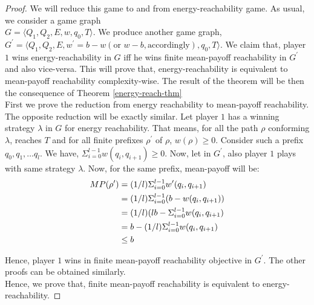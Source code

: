 \begin{proof}
We will reduce this game to and from energy-reachability game. As usual, we consider a game graph\\ $G=\langle Q_1, Q_2, E, w, q_0,T\rangle$. We produce another game graph, $G^{\prime}=\langle Q_1, Q_2, E, w^{\prime}= b-w (\text{or } w-b, \text{accordingly}), q_0,T\rangle$. We claim that, player $1$ wins energy-reachability in $G$ iff he wins finite mean-payoff reachability in $G^{\prime}$ and also vice-versa. This will prove that, energy-reachability is equivalent to mean-payoff reachability complexity-wise. The result of the theorem will be then the consequence of Theorem \ref{energy-reach-thm}\\
First we prove the reduction from energy reachability to mean-payoff reachability. The opposite reduction will be exactly similar. Let player $1$ has a winning strategy $\lambda$ in $G$ for energy reachability. That means, for all the path $\rho$ conforming $\lambda$, reaches $T$ and for all finite prefixes $\rho^{\prime}$ of $\rho$, $w(\rho)\geq 0$. Consider such a prefix $q_0,q_1,\ldots q_l$. We have, $\Sigma_{i=0}^{l-1} w(q_i,q_{i+1}) \geq 0$. Now, let in $G^{\prime}$, also player $1$ plays with same strategy $\lambda$. Now, for the same prefix, mean-payoff will be:
\begin{align}
\notag
\centering
MP(\rho^{\prime})&= (1/l)\Sigma_{i=0}^{l-1} w^{\prime}(q_i,q_{i+1})\\
&=(1/l)\Sigma_{i=0}^{l-1} (b- w(q_i,q_{i+1}))\\
&=(1/l)(lb- \Sigma_{i=0}^{l-1} w(q_i,q_{i+1})\\
&=b- (1/l)\Sigma_{i=0}^{l-1} w(q_i,q_{i+1})\\
&\leq b
\end{align}


Hence, player $1$ wins in finite mean-payoff reachability objective in $G^{\prime}$. The other proofs can be obtained similarly.\\
Hence, we prove that, finite mean-payoff reachability is equivalent to energy-reachability.

\end{proof}

